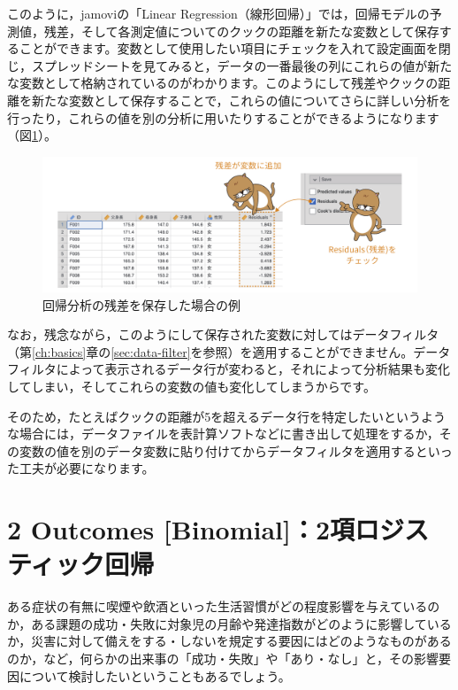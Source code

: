 \documentclass[
  12pt,
  a5jpaper,
  lualatex, ja=standard]{bxjsbook}
\begin{document}
このように，jamoviの「Linear Regression（線形回帰）」では，回帰モデルの予測値，残差，そして各測定値についてのクックの距離を新たな変数として保存することができます。変数として使用したい項目にチェックを入れて設定画面を閉じ，スプレッドシートを見てみると，データの一番最後の列にこれらの値が新たな変数として格納されているのがわかります。このようにして残差やクックの距離を新たな変数として保存することで，これらの値についてさらに詳しい分析を行ったり，これらの値を別の分析に用いたりすることができるようになります（図\ref{fig:regression-lr-save-residuals}）。

\begin{figure}[!ht]

{\centering \includegraphics[width=1\linewidth]{images/regression/lr-save-residuals} 

}

\caption{回帰分析の残差を保存した場合の例}\label{fig:regression-lr-save-residuals}
\end{figure}

なお，残念ながら，このようにして保存された変数に対してはデータフィルタ（第\ref{ch:basics}章の\ref{sec:data-filter}を参照）を適用することができません。データフィルタによって表示されるデータ行が変わると，それによって分析結果も変化してしまい，そしてこれらの変数の値も変化してしまうからです。

そのため，たとえばクックの距離が5を超えるデータ行を特定したいというような場合には，データファイルを表計算ソフトなどに書き出して処理をするか，その変数の値を別のデータ変数に貼り付けてからデータフィルタを適用するといった工夫が必要になります。

\hypertarget{sec:regression-binomial}{%
\section{2 Outcomes {[}Binomial{]}：2項ロジスティック回帰}\label{sec:regression-binomial}}

ある症状の有無に喫煙や飲酒といった生活習慣がどの程度影響を与えているのか，ある課題の成功・失敗に対象児の月齢や発達指数がどのように影響しているか，災害に対して備えをする・しないを規定する要因にはどのようなものがあるのか，など，何らかの出来事の「成功・失敗」や「あり・なし」と，その影響要因について検討したいということもあるでしょう。
\end{document}
